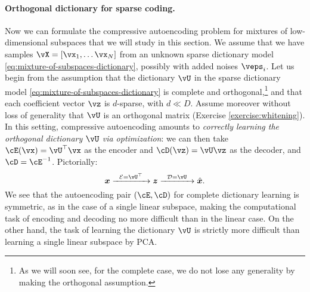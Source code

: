 \documentclass[../../book-main.tex]{subfiles}
\begin{document}
\paragraph{Orthogonal dictionary for sparse coding.}
Now we can formulate the compressive autoencoding problem for mixtures of low-dimensional subspaces that we will study in this section.
We assume that we have samples $\vX = [\vx_1, \dots \vx_N]$ from an unknown sparse dictionary model \eqref{eq:mixture-of-subspaces-dictionary}, possibly with added noises $\veps_i$.
Let us begin from the assumption that the dictionary $\vU$ in the sparse dictionary model \eqref{eq:mixture-of-subspaces-dictionary} is complete and orthogonal,\footnote{As we will soon see, for the complete case, we do not lose any generality by making the orthogonal assumption.} and that each coefficient vector $\vz$ is $d$-sparse, with $d \ll D$.
Assume moreover without loss of generality that $\vU$ is an orthogonal matrix (Exercise \ref{exercise:whitening}).
In this setting, compressive autoencoding amounts to \textit{correctly learning the orthogonal dictionary $\vU$ via optimization}: we
can then take $\cE(\vx) = \vU^\top \vx$ as the encoder and $\cD(\vz) = \vU \vz$ as the decoder, and $\cD = \cE^{-1}$. Pictorially:
\begin{equation}
\x \xrightarrow{\hspace{2mm} \mathcal{E} = \vU^\top \hspace{2mm}}  \z \xrightarrow{\hspace{2mm} \mathcal{D} = \vU \hspace{2mm}}   \hat{\x}.  
\label{eqn:autoencoding-DL}
\end{equation}    
We see that the autoencoding pair $(\cE, \cD)$ for complete dictionary learning is symmetric, as in the case of a single linear subspace, making the computational task of encoding and decoding no more difficult than in the linear case. On the other hand, the task of learning the dictionary $\vU$ is strictly more difficult than learning a single linear subspace by PCA. 
\end{document}
